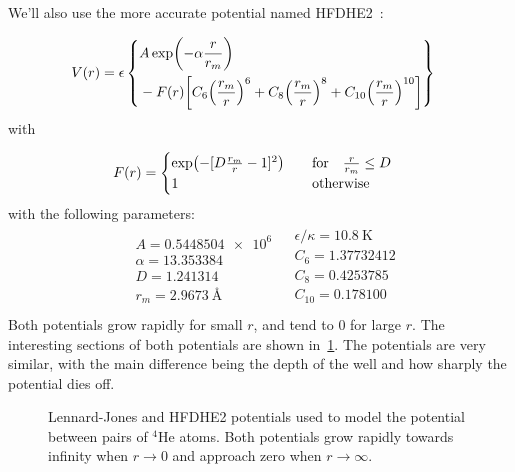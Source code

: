 \documentclass[Thesis.tex]{subfiles}
\begin{document}
We'll also use the more accurate potential named HFDHE2~\cite{Kalos-1981}:

\begin{align}
    \label{eq:HFDHE2-def}
    V(r) &= \epsilon
    \left\{\!\begin{aligned}
        &A \exp(-\alpha \frac{r }{ r_m})\\
        &- F(r) \qty[ C_6  \qty(\frac{r_m }{ r})^6 + C_8  \qty(\frac{r_m }{ r})^8 + C_{10} \qty(\frac{r_m }{ r})^{10}]
    \end{aligned}\right\}
\end{align}
with

\begin{align}
    F(r) &= \begin{cases}
        \exp( - [D \frac{r_m}{r} -  1]^2 ) & \qfor \frac{r}{r_m} \leq D\\
        1 & \qotherwise
    \end{cases}
\end{align}
with the following parameters:
\begin{align}\label{eq:HFDHE2-parameters}
    \begin{split}
        &A = \num{0.5448504e6}\\
        &\alpha = \num{13.353384}\\
        &D = \num{1.241314}\\
        &r_m= \SI{2.9673}{\angstrom}
    \end{split}
    \begin{split}
        &\epsilon/\kappa = \SI{10.8}{\K}\\
        &C_6= \num{1.37732412}\\
        &C_8= \num{0.4253785}\\
        &C_{10}= \num{0.178100}\\
    \end{split}
\end{align}
Both potentials grow rapidly for small $r$, and tend to $0$ for large $r$. The
interesting sections of both potentials are shown
in~\cref{fig:helium-potentials-plot}. The potentials are very similar, with the
main difference being the depth of the well and how sharply the potential dies
off.

\begin{figure}[h]
  \centering
  
  \caption{Lennard-Jones and HFDHE2 potentials used to model the potential
    between pairs of $^4$He atoms. Both potentials grow rapidly towards infinity
  when $r\to0$ and approach zero when $r\to\infty$.}
  \label{fig:helium-potentials-plot}
\end{figure}
\end{document}

